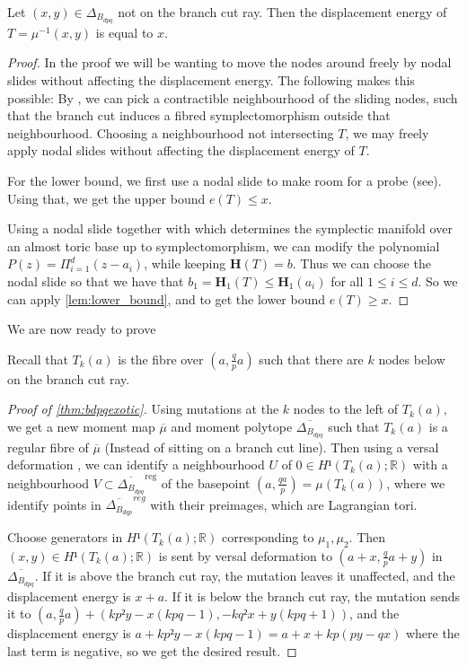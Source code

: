 \documentclass[12pt,a4paper,draft]{scrartcl}
\begin{document}
\begin{lemma}
  \label{lem:bdq_displacement}
  Let $(x,y) ∈ Δ_{B_{dpq}}$ not on the branch cut ray. Then the displacement energy of $T = μ^{-1}(x,y)$ is equal to $x$.
\end{lemma}

\begin{proof}
  In the proof we will be wanting to move the nodes around freely by nodal slides without affecting the displacement energy. The following makes this possible:
  By \cite[Theorem 8.9]{evans2021atfs}, we can pick a contractible neighbourhood of the sliding nodes, such that the branch cut induces a fibred symplectomorphism outside that neighbourhood. Choosing a neighbourhood not intersecting $T$, we may freely apply nodal slides without affecting the displacement energy of $T$.

  For the lower bound, we first use a nodal slide to make room for a probe (see). Using that, we get the upper bound $e(T)≤x$.
  
  Using a nodal slide together with \cite[Corollary 5.4]{symington2002FourDF} which determines the symplectic manifold over an almost toric base up to symplectomorphism, we can modify the polynomial $P(z) = Π_{i=1}^d (z-a_i)$, while keeping $\symbf{H}(T) = {b}$.
  Thus we can choose the nodal slide so that we have that $b_1 = \symbf{H}_1(T) ≤ \symbf{H}_1(a_i)$ for all $ 1 ≤ i ≤ d$.
  So we can apply \cref{lem:lower_bound}, and to get the lower bound $e(T) ≥ x$.
\end{proof}

We are now ready to prove

\thmbdpqexotic*

Recall that $T_k(a)$ is the fibre over $(a,\frac{q}{p}a)$ such that there are $k$ nodes below on the branch cut ray.

\begin{proof}[Proof of \cref{thm:bdpqexotic}]
  Using mutations at the $k$ nodes to the left of $T_k(a)$, we get a new moment map $\overline{μ}$ and moment polytope $\overline{Δ_{B_{dpq}}}$ such that $T_k(a)$ is a regular  fibre of $\overline{μ}$ (Instead of sitting on a branch cut line).
  Then using a versal deformation , we can identify a neighbourhood $U$ of $0 ∈ H¹(T_k(a);ℝ)$ with a neighbourhood $V ⊂ \overline{Δ_{B_{dpq}}}^{\text{reg}}$ of the basepoint $(a,\frac{qa}{p}) = μ(T_k(a))$, where we identify points in $\overline{Δ_{B_{dqp}}}^{reg}$ with their preimages, which are Lagrangian tori.

  Choose generators in $H¹(T_k(a);ℝ)$ corresponding to $μ_1,μ_2$. Then $(x,y) ∈ H¹(T_k(a);ℝ)$ is sent by versal deformation to $(a + x, \frac{q}{p}a + y)$ in $\overline{Δ_{B_{dpq}}}$.
  If it is above the branch cut ray, the mutation leaves it unaffected, and the displacement energy is $x+a$.
  If it is below the branch cut ray, the mutation sends it to $(a,\frac{q}{p}a) + (kp²y -x(kpq -1), -kq²x + y(kpq +1))$, and the displacement energy is $a +kp²y - x(kpq-1) = a + x + kp(py-qx)$ where the last term is negative, so we get the desired result.
\end{proof}
\end{document}
